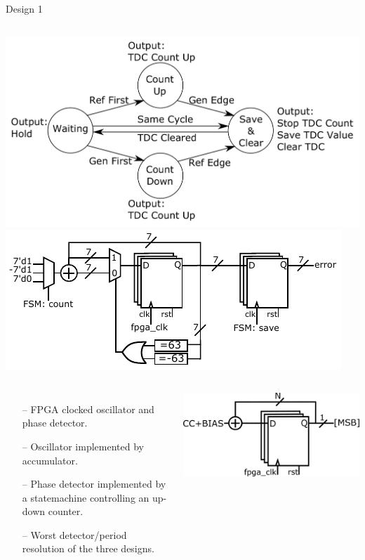 \documentclass{beamer}
\begin{document}
\begin{frame}{Design 1}
\vspace{-0.67 cm}

\begin{columns}
	\includegraphics[width=1\linewidth]{../state_trans_new}
	\includegraphics[width=1\linewidth]{../updown}
\end{columns}
\begin{columns}
	\begin{itemize}
		\item[--]
		FPGA clocked oscillator and phase detector.
		\item[--]
		Oscillator implemented by accumulator.
		\item[--]
		Phase detector implemented by a statemachine controlling an up-down counter.
		\item[--]
		Worst detector/period resolution of the three designs.
	\end{itemize}
	\includegraphics[width=1\linewidth]{../osc2}
\end{columns}

\end{frame}
\end{document}
